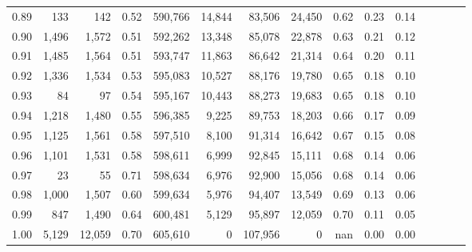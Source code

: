 \begin{tabular}{rrrcrrrrrrrrrrr}
0.89 &     133 &     142 &                                       0.52 &  590,766 &   14,844 &   83,506 &   24,450 &  0.62 &  0.23 &                         0.14 \\
0.90 &   1,496 &   1,572 &                                       0.51 &  592,262 &   13,348 &   85,078 &   22,878 &  0.63 &  0.21 &                         0.12 \\
0.91 &   1,485 &   1,564 &                                       0.51 &  593,747 &   11,863 &   86,642 &   21,314 &  0.64 &  0.20 &                         0.11 \\
0.92 &   1,336 &   1,534 &                                       0.53 &  595,083 &   10,527 &   88,176 &   19,780 &  0.65 &  0.18 &                         0.10 \\
0.93 &      84 &      97 &                                       0.54 &  595,167 &   10,443 &   88,273 &   19,683 &  0.65 &  0.18 &                         0.10 \\
0.94 &   1,218 &   1,480 &                                       0.55 &  596,385 &    9,225 &   89,753 &   18,203 &  0.66 &  0.17 &                         0.09 \\
0.95 &   1,125 &   1,561 &                                       0.58 &  597,510 &    8,100 &   91,314 &   16,642 &  0.67 &  0.15 &                         0.08 \\
0.96 &   1,101 &   1,531 &                                       0.58 &  598,611 &    6,999 &   92,845 &   15,111 &  0.68 &  0.14 &                         0.06 \\
0.97 &      23 &      55 &                                       0.71 &  598,634 &    6,976 &   92,900 &   15,056 &  0.68 &  0.14 &                         0.06 \\
0.98 &   1,000 &   1,507 &                                       0.60 &  599,634 &    5,976 &   94,407 &   13,549 &  0.69 &  0.13 &                         0.06 \\
0.99 &     847 &   1,490 &                                       0.64 &  600,481 &    5,129 &   95,897 &   12,059 &  0.70 &  0.11 &                         0.05 \\
1.00 &   5,129 &  12,059 &                                       0.70 &  605,610 &        0 &  107,956 &        0 &   nan &  0.00 &                         0.00 \\
\bottomrule
\end{tabular}

